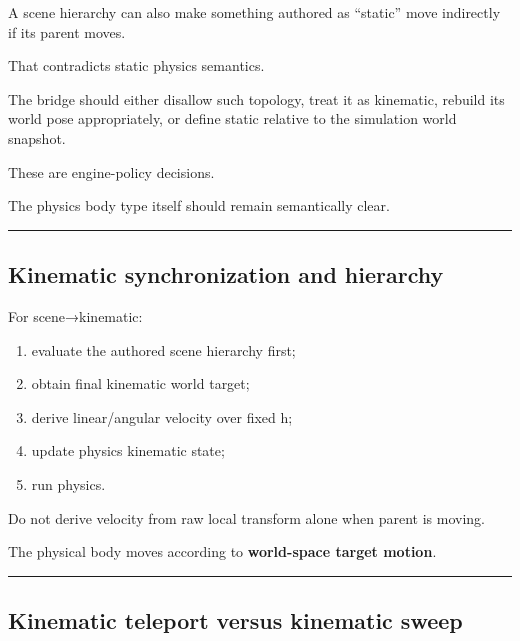 A scene hierarchy can also make something authored as ``static'' move indirectly if its parent moves.

That contradicts static physics semantics.

The bridge should either disallow such topology, treat it as kinematic, rebuild its world pose appropriately, or define static relative to the simulation world snapshot.

These are engine-policy decisions.

The physics body type itself should remain semantically clear.

\begin{center}\rule{0.5\linewidth}{0.5pt}\end{center}

\subsection{Kinematic synchronization and hierarchy}\label{06-engine-ii-ch038-kinematic-synchronization-and-hierarchy}

\hypertarget{06-engine-ii-ch038-kinematic-synchronization-and-hierarchy}{}

For scene→kinematic:

\begin{enumerate}
\def\labelenumi{\arabic{enumi}.}
\tightlist
\item
  evaluate the authored scene hierarchy first;
\item
  obtain final kinematic world target;
\item
  derive linear/angular velocity over fixed h;
\item
  update physics kinematic state;
\item
  run physics.
\end{enumerate}

Do not derive velocity from raw local transform alone when parent is moving.

The physical body moves according to \textbf{world-space target motion}.

\begin{center}\rule{0.5\linewidth}{0.5pt}\end{center}

\subsection{Kinematic teleport versus kinematic sweep}\label{06-engine-ii-ch038-kinematic-teleport-versus-kinematic-sweep}


